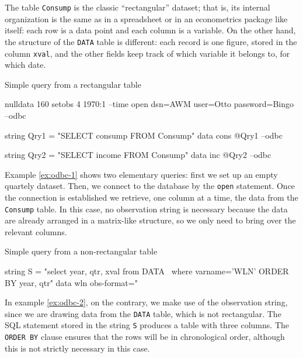 The table \texttt{Consump} is the classic ``rectangular'' dataset;
that is, its internal organization is the same as in a spreadsheet or
in an econometrics package like  itself: each row is a data
point and each column is a variable. On the other hand, the structure
of the \texttt{DATA} table is different: each record is one figure,
stored in the column \texttt{xval}, and the other fields keep track of
which variable it belongs to, for which date.

\begin{script}[htbp]
  \caption{Simple query from a rectangular table}
  \label{ex:odbc-1}
\begin{scode}
nulldata 160
setobs 4 1970:1 --time
open dsn=AWM user=Otto password=Bingo --odbc

string Qry1 = "SELECT consump FROM Consump"
data cons @Qry1 --odbc

string Qry2 = "SELECT income FROM Consump"
data inc @Qry2 --odbc
\end{scode}
\end{script}

Example \ref{ex:odbc-1} shows two elementary queries: first we set up
an empty quartely dataset. Then, we connect to the database by the
\texttt{open} statement. Once the connection is established we
retrieve, one column at a time, the data from the \texttt{Consump}
table. In this case, no observation string is necessary because the
data are already arranged in a matrix-like structure, so we only need
to bring over the relevant columns.

\begin{script}[htbp]
  \caption{Simple query from a non-rectangular table}
  \label{ex:odbc-2}
\begin{scode}
string S = "select year, qtr, xval from DATA \
       where varname='WLN' ORDER BY year, qtr"
data wln obs-format="%
\end{scode}
\end{script}

In example \ref{ex:odbc-2}, on the contrary, we make use of the
observation string, since we are drawing data from the \texttt{DATA}
table, which is not rectangular. The SQL statement stored in the
string \texttt{S} produces a table with three columns. The
\texttt{ORDER BY} clause ensures that the rows will be in
chronological order, although this is not strictly necessary in this
case.

